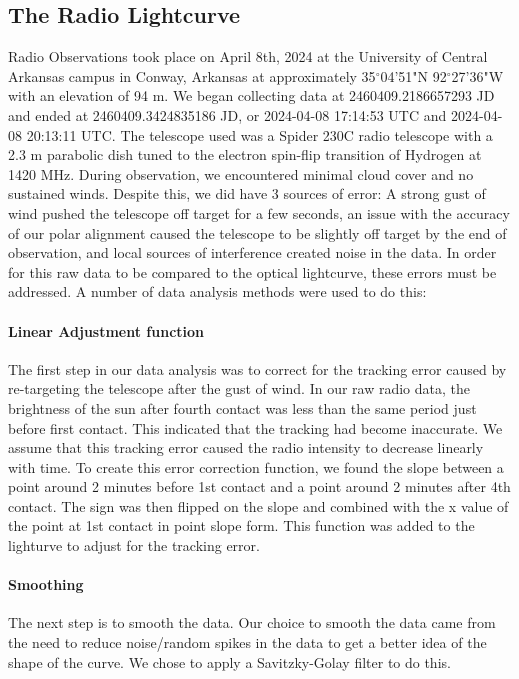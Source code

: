 \subsection{\label{sec:radio}The Radio Lightcurve}
Radio Observations took place on April 8th, 2024 at the University of Central Arkansas campus in Conway, Arkansas at approximately 35$^\circ$04'51"N 92$^\circ$27'36"W with an elevation of 94 m.
We began collecting data at 2460409.2186657293 JD and ended at 2460409.3424835186 JD, or 2024-04-08 17:14:53 UTC and 2024-04-08 20:13:11 UTC.
The telescope used was a Spider 230C radio telescope with a 2.3 m parabolic dish tuned to the electron spin-flip transition of Hydrogen at 1420 MHz.
During observation, we encountered minimal cloud cover and no sustained winds.
Despite this, we did have 3 sources of error: A strong gust of wind pushed the telescope off target for a few seconds, an issue with the accuracy of our polar alignment caused the telescope to be slightly off target by the end of observation, and local sources of interference created noise in the data.
In order for this raw data to be compared to the optical lightcurve, these errors must be addressed.
A number of data analysis methods were used to do this:
\paragraph{Linear Adjustment function}
The first step in our data analysis was to correct for the tracking error caused by re-targeting the telescope after the gust of wind.
In our raw radio data, the brightness of the sun after fourth contact was less than the same period just before first contact.
This indicated that the tracking had become inaccurate.
We assume that this tracking error caused the radio intensity to decrease linearly with time.
To create this error correction function, we found the slope between a point around 2 minutes before 1st contact and a point around 2 minutes after 4th contact. 
The sign was then flipped on the slope and combined with the x value of the point at 1st contact in point slope form.
This function was added to the lighturve to adjust for the tracking error.
\paragraph{Smoothing}
The next step is to smooth the data.
Our choice to smooth the data came from the need to reduce noise/random spikes in the data to get a better idea of the shape of the curve.
We chose to apply a Savitzky-Golay filter \cite{savitzky_golay_1964} to do this.
